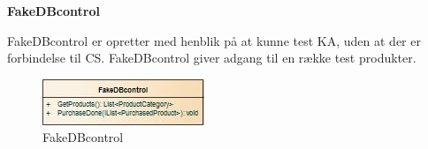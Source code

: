 \textbf{FakeDBcontrol}

FakeDBcontrol er opretter med henblik på at kunne test \gls{KA}, uden at der er forbindelse til \gls{CS}. FakeDBcontrol giver adgang til en række test produkter.

\begin{figure}[H]
    \centering
    \includegraphics[]{Systemdesign/Frontend/DAL/Pics/FakeDBcontrol}
    \caption{FakeDBcontrol}
    \label{fig:FakeDBcontrol}
\end{figure}

\bigskip